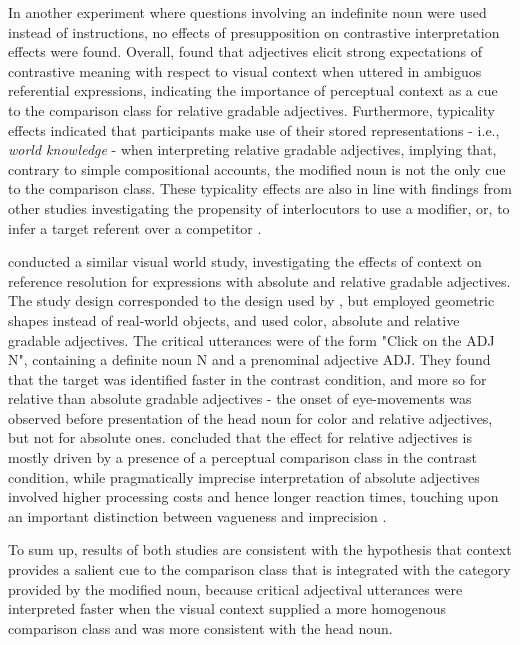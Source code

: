  In another experiment where questions involving an indefinite noun were used instead of instructions,  no effects of presupposition on contrastive interpretation effects were found.
 Overall, \textcite{sedivy1999} found that adjectives elicit strong expectations of contrastive meaning with respect to visual context when uttered in ambiguos referential expressions, indicating the importance of perceptual context as a cue to the comparison class for relative gradable adjectives. Furthermore, typicality effects indicated that participants make use of their stored representations - i.e., \textit{world knowledge} - when interpreting relative gradable adjectives, implying that, contrary to simple compositional accounts, the modified noun is not the only cue to the comparison class. 
These typicality effects are also in line with findings from other studies investigating the propensity of interlocutors to use a modifier, or, to infer a target referent over a competitor \parencite{KreissDegen2020, bergey2020}.
  
\textcite{Aparicio2016} conducted a similar visual world study, investigating the effects of context on reference resolution for expressions with absolute and relative gradable adjectives. 
The study design corresponded to the design used by \parencite{sedivy1999}, but employed geometric shapes instead of real-world objects, and used color, absolute and relative gradable adjectives.  The critical utterances were of the form "Click on the ADJ N", containing a definite noun N and a prenominal adjective ADJ. They found that the target was identified faster in the contrast condition, and more so for relative than absolute gradable adjectives - the onset of eye-movements was observed before presentation of the head noun for color and relative adjectives, but not for absolute ones. \textcite{Aparicio2016} concluded that the effect for relative adjectives is mostly driven by a presence of a perceptual comparison class in the contrast condition, while pragmatically imprecise interpretation of absolute adjectives involved higher processing costs and hence longer reaction times, touching upon an important distinction between vagueness and imprecision \parencite[cf.][]{Kennedy2007}. 

 To sum up, results of both studies are consistent with the  hypothesis that context provides a salient cue to the comparison class that is integrated with the category provided by the modified  noun, because critical adjectival utterances were interpreted faster when the visual context supplied a more homogenous comparison class and was more consistent with the head noun. 

